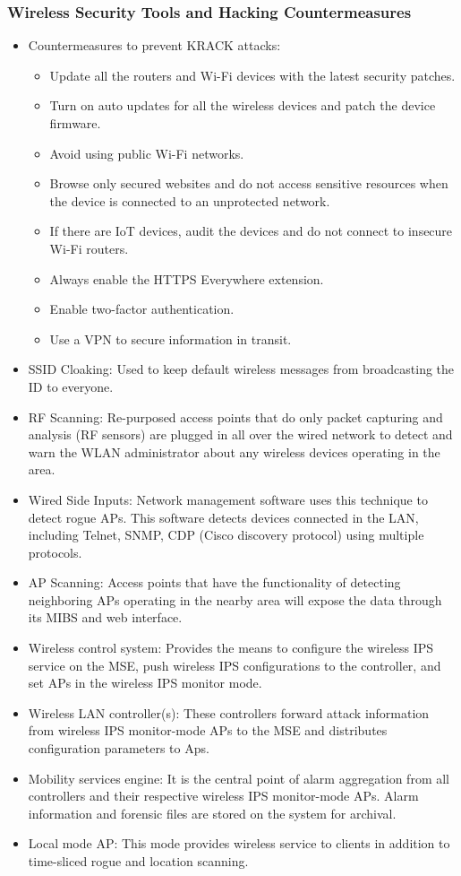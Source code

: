 \subsubsection{Wireless Security Tools and Hacking Countermeasures}
\begin{itemize}
    \item Countermeasures to prevent KRACK attacks:
    \begin{itemize}
        \item Update all the routers and Wi-Fi devices with the latest security patches.
        \item Turn on auto updates for all the wireless devices and patch the device firmware.
        \item Avoid using public Wi-Fi networks.
        \item Browse only secured websites and do not access sensitive resources when the device is connected to an unprotected network.
        \item If there are IoT devices, audit the devices and do not connect to insecure Wi-Fi routers.
        \item Always enable the HTTPS Everywhere extension.
        \item Enable two-factor authentication.
        \item Use a VPN to secure information in transit.
    \end{itemize}
    \item SSID Cloaking: Used to keep default wireless messages from broadcasting the ID to everyone.
    \item RF Scanning: Re-purposed access points that do only packet capturing and analysis (RF sensors) are plugged in all over the wired network to detect and warn the WLAN administrator about any wireless devices operating in the area.
    \item Wired Side Inputs: Network management software uses this technique to detect rogue APs. This software detects devices connected in the LAN, including Telnet, SNMP, CDP (Cisco discovery protocol) using multiple protocols.
    \item AP Scanning: Access points that have the functionality of detecting neighboring APs operating in the nearby area will expose the data through its MIBS and web interface.
    \item Wireless control system: Provides the means to configure the wireless IPS service on the MSE, push wireless IPS configurations to the controller, and set APs in the wireless IPS monitor mode.
    \item Wireless LAN controller(s): These controllers forward attack information from wireless IPS monitor-mode APs to the MSE and distributes configuration parameters to Aps.
    \item Mobility services engine: It is the central point of alarm aggregation from all controllers and their respective wireless IPS monitor-mode APs. Alarm information and forensic files are stored on the system for archival.
    \item  Local mode AP: This mode provides wireless service to clients in addition to time-sliced rogue and location scanning.
\end{itemize}


